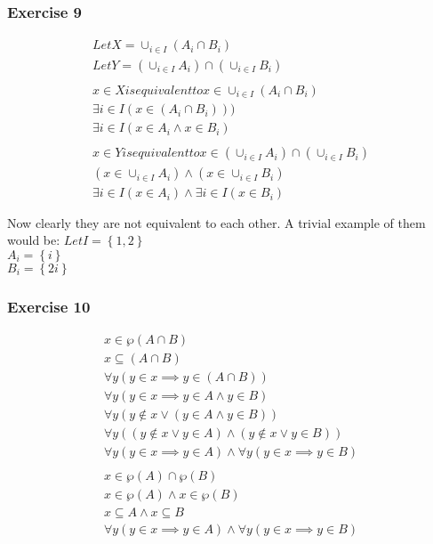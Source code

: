 \subsubsection{Exercise 9}
\begin{align*}
  Let X = \cup_{i \in I} (A_i \cap B_i) \\
  Let Y = (\cup_{i \in I}A_i) \cap (\cup_{i \in  I} B_i) \\ \\
  x \in X is equivalent to x \in \cup_{i \in I} (A_i \cap B_i) \\
  \exists i \in I(x \in (A_i \cap B_i))) \\
  \exists i \in I(x \in A_i \land x \in B_i) \\ \\
  x \in Y is equivalent to x \in (\cup_{i \in I}A_i) \cap (\cup_{i \in  I} B_i) \\
  (x \in \cup_{i \in I}A_i) \land (x \in \cup_{i \in  I} B_i) \\
  \exists i \in I(x \in A_i) \land \exists i \in I (x \in B_i) \\ \\
\end{align*}
Now clearly they are not equivalent to each other. A trivial example of them would be:
$Let I = \left\{1,2\right\}$ \\
$A_i = \left\{i\right\}$ \\
$B_i = \left\{2i\right\}$ \\

\subsubsection{Exercise 10}
\begin{align*}
  x \in \wp(A \cap B) \\
  x \subseteq (A \cap B) \\
  \forall y (y \in x \implies y \in (A \cap B)) \\
  \forall y (y \in x \implies y \in A \land y \in B) \\
  \forall y (y \notin x \lor (y \in A \land y \in B)) \\
  \forall y ((y \notin x \lor y \in A) \land (y \notin x \lor y \in B)) \\
  \forall y(y \in x \implies y \in A) \land \forall y(y \in x \implies y \in B) \\ \\
  x \in \wp(A) \cap \wp(B) \\
  x \in \wp(A) \land x \in \wp(B) \\
  x \subseteq A \land x \subseteq B \\
  \forall y(y \in x \implies y \in A) \land \forall y(y \in x \implies y \in B) \\
\end{align*}
